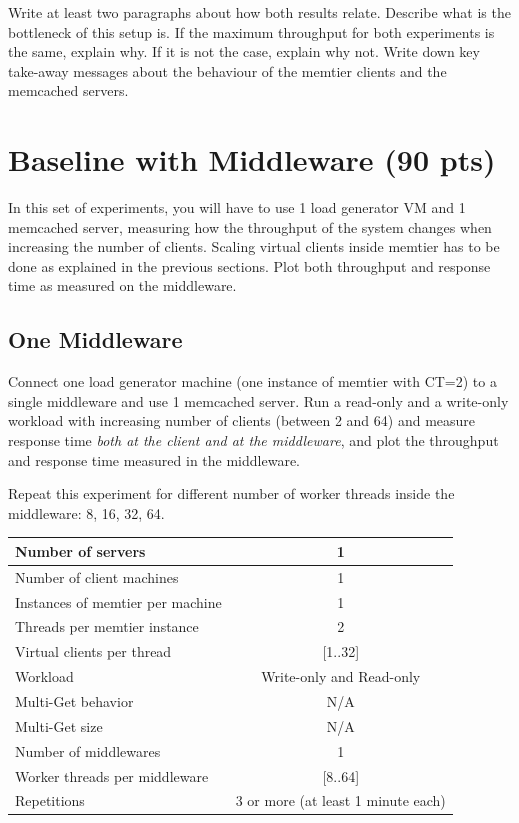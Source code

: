\documentclass[11pt,a4paper]{article}
\begin{document}
Write at least two paragraphs about how both results relate. Describe what is the bottleneck of this setup is. If the maximum throughput for both experiments is the same, explain why. If it is not the case, explain why not. Write down key take-away messages about the behaviour of the memtier clients and the memcached servers.

\section{Baseline with Middleware (90 pts)}

In this set of experiments, you will have to use 1 load generator VM and 1 memcached server, measuring how the throughput of the system changes when increasing the number of clients. Scaling virtual clients inside memtier has to be done as explained in the previous sections. Plot both throughput and response time as measured on the middleware.

\subsection{One Middleware}

Connect one load generator machine (one instance of memtier with CT=2) to a single middleware and use 1 memcached server. Run a read-only and a write-only workload with increasing number of clients (between 2 and 64) and measure response time \emph{both at the client and at the middleware}, and plot the throughput and response time measured in the middleware.

Repeat this experiment for different number of worker threads inside the middleware: 8, 16, 32, 64.

\begin{center}
	\scriptsize{
		\begin{tabular}{|l|c|}
			\hline Number of servers                & 1                        \\
			\hline Number of client machines        & 1                        \\
			\hline Instances of memtier per machine & 1                        \\
			\hline Threads per memtier instance     & 2                        \\
			\hline Virtual clients per thread       & [1..32]                  \\
			\hline Workload                         & Write-only and Read-only \\
			\hline Multi-Get behavior               & N/A                      \\
			\hline Multi-Get size                   & N/A                      \\
			\hline Number of middlewares            & 1                        \\
			\hline Worker threads per middleware    & [8..64]                  \\
			\hline Repetitions                      & 3 or more (at least 1 minute each)                \\
			\hline
		\end{tabular}
	}
\end{center}
\end{document}
